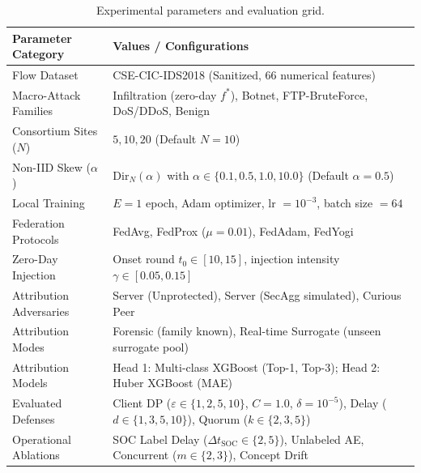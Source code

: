 \begin{table}[t]
\centering
\small
\caption{Experimental parameters and evaluation grid.}
\label{tab:parameters}
\begin{tabular}{p{2.6cm}p{5.4cm}}

\toprule
\textbf{Parameter Category} & \textbf{Values / Configurations} \\
\midrule
Flow Dataset & CSE-CIC-IDS2018 (Sanitized, 66 numerical features) \\
Macro-Attack Families & Infiltration (zero-day $f^*$), Botnet, FTP-BruteForce, DoS/DDoS, Benign \\
Consortium Sites ($N$) & $5, 10, 20$ (Default $N=10$) \\
Non-IID Skew ($\alpha$) & $\text{Dir}_N(\alpha)$ with $\alpha \in \{0.1, 0.5, 1.0, 10.0\}$ (Default $\alpha=0.5$) \\
Local Training & $E = 1$ epoch, Adam optimizer, lr $= 10^{-3}$, batch size $= 64$ \\
Federation Protocols & FedAvg, FedProx ($\mu=0.01$), FedAdam, FedYogi \\
Zero-Day Injection & Onset round $t_0 \in [10, 15]$, injection intensity $\gamma \in [0.05, 0.15]$ \\
Attribution Adversaries & Server (Unprotected), Server (SecAgg simulated), Curious Peer \\
Attribution Modes & Forensic (family known), Real-time Surrogate (unseen surrogate pool) \\
Attribution Models & Head 1: Multi-class XGBoost (Top-1, Top-3); Head 2: Huber XGBoost (MAE) \\
Evaluated Defenses & Client DP ($\varepsilon \in \{1, 2, 5, 10\}$, $C=1.0$, $\delta=10^{-5}$), Delay ($d \in \{1, 3, 5, 10\}$), Quorum ($k \in \{2, 3, 5\}$) \\
Operational Ablations & SOC Label Delay ($\Delta t_{\text{SOC}} \in \{2, 5\}$), Unlabeled AE, Concurrent ($m \in \{2, 3\}$), Concept Drift \\
\bottomrule
\end{tabular}
\end{table}
